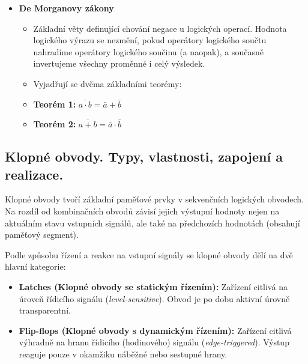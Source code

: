 \begin{itemize}
            \item \textbf{De Morganovy zákony}
            \begin{itemize}
                \item Základní věty definující chování negace u logických operací. Hodnota logického výrazu se nezmění, pokud operátory logického součtu nahradíme operátory logického součinu (a naopak), a současně invertujeme všechny proměnné i celý výsledek.
                \item Vyjadřují se dvěma základními teorémy:
                \item \textbf{Teorém 1:} $\overline{a \cdot b} = \bar{a} + \bar{b}$
                \item \textbf{Teorém 2:} $\overline{a + b} = \bar{a} \cdot \bar{b}$
            \end{itemize}
        \end{itemize}
\subsection{Klopné obvody. Typy, vlastnosti, zapojení a realizace.}
        Klopné obvody tvoří základní paměťové prvky v sekvenčních logických obvodech. Na rozdíl od kombinačních obvodů závisí jejich výstupní hodnoty nejen na aktuálním stavu vstupních signálů, ale také na předchozích hodnotách (obsahují paměťový segment).
        
        Podle způsobu řízení a reakce na vstupní signály se klopné obvody dělí na dvě hlavní kategorie:
        \begin{itemize}
            \item \textbf{Latches (Klopné obvody se statickým řízením):} Zařízení citlivá na úroveň řídicího signálu (\textit{level-sensitive}). Obvod je po dobu aktivní úrovně transparentní.
            \item \textbf{Flip-flops (Klopné obvody s dynamickým řízením):} Zařízení citlivá výhradně na hranu řídicího (hodinového) signálu (\textit{edge-triggered}). Výstup reaguje pouze v okamžiku náběžné nebo sestupné hrany.
        \end{itemize}
